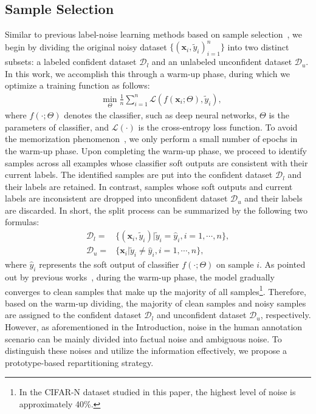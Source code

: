 \documentclass[letterpaper]{article} %
\begin{document}
\subsection{Sample Selection}

Similar to previous label-noise learning methods based on sample selection~\cite{DBLP:journals/corr/abs-2303-10802, DBLP:journals/corr/abs-2007-08199, DBLP:conf/iclr/WeiZ0L0022}, we begin by dividing the original noisy dataset $\{({\bm{x}_{i}, \tilde{y}_{i}})_{i = 1}^{n}\}$ into two distinct subsets: a labeled confident dataset $\mathcal{D}_{l}$ and an unlabeled unconfident dataset $\mathcal{D}_{u}$. In this work, we accomplish this through a warm-up phase, during which we optimize a training function as follows:
\begin{align}
& \min_{\Theta}\frac{1}{n}\sum_{i = 1}^{n}\mathcal{L}(f(\bm{x}_{i};\Theta), {\tilde{y}_{i}}),
\label{equ:warm_up}
\end{align}
where $f(\cdot; \Theta)$ denotes the classifier, such as deep neural networks, $\Theta$ is the parameters of classifier, and $\mathcal{L(\cdot)}$ is the cross-entropy loss function. To avoid the memorization phenomenon~\cite{DBLP:conf/icml/ArpitJBKBKMFCBL17}, we only perform a small number of epochs in the warm-up phase. Upon completing the warm-up phase, we proceed to identify samples across all examples whose classifier soft outputs are consistent with their current labels. The identified samples are put into the confident dataset $\mathcal{D}_{l}$ and their labels are retained. In contrast, samples whose soft outputs and current labels are inconsistent are dropped into unconfident dataset $\mathcal{D}_{u}$ and their labels are discarded. In short, the split process can be summarized by the following two formulas:
\begin{align}
    \mathcal{D}_{l} = & \{({\bm{x}_{i}, \tilde{y}_{i}})|\tilde{y}_{i} = \hat{y}_i, i = 1, \cdots, n\},\label{equ:conf}\\
    \mathcal{D}_{u} = & \{\bm{x}_{i}| \tilde{y}_{i} \neq \hat{y}_i, i = 1, \cdots, n\}\label{equ:unconf},
\end{align}
where $\hat{y}_i$ represents the soft output of classifier $f(\cdot; \Theta)$ on sample $i$. As pointed out by previous works~\cite{DBLP:conf/nips/BaiYHYLMNL21}, during the warm-up phase, the model gradually converges to clean samples that make up the majority of all samples\footnote{In the CIFAR-N dataset studied in this paper, the highest level of noise is approximately 40\%.}. Therefore, based on the warm-up dividing, the majority of clean samples and noisy samples are assigned to the confident dataset $\mathcal{D}_{l}$ and unconfident dataset $\mathcal{D}_{u}$, respectively. However, as aforementioned in the Introduction, noise in the human annotation scenario can be mainly divided into factual noise and ambiguous noise. To distinguish these noises and utilize the information effectively, we propose a prototype-based repartitioning strategy.
\end{document}
